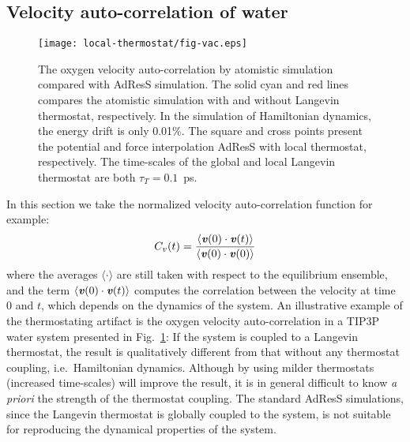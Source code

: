 \documentclass[epjST]{svjour}
\newcommand{\vect}[1]{\textbf{\textit{#1}}}
\begin{document}


\subsection{Velocity auto-correlation of water}

\begin{figure}
  \centering
  \texttt{[image: local-thermostat/fig-vac.eps]}
  \caption{The oxygen velocity auto-correlation by atomistic
    simulation compared with AdResS simulation.  The solid cyan and
    red lines compares the atomistic simulation with and without
    Langevin thermostat, respectively.
    In the simulation of Hamiltonian dynamics, the energy drift is only 0.01\%.
    The square and cross points
    present the potential and force interpolation AdResS with local
    thermostat, respectively.  The time-scales of the global and local Langevin
  thermostat are both $\tau_T = 0.1$~ps.}
  \label{fig:vac}
\end{figure}

In this section we take the normalized velocity auto-correlation function
for example:
\begin{align}
  C_v(t) = \frac{\langle \vect v(0)\cdot \vect v(t) \rangle}{\langle \vect v(0)\cdot \vect v(0) \rangle}
\end{align}
where the averages $\langle\cdot\rangle$ are still taken with respect
to the equilibrium ensemble, and the term
$\langle \vect v(0)\cdot \vect v(t)\rangle$ computes the correlation
between the velocity at time $0$ and $t$, which depends on the dynamics of the system. 
An illustrative example of the thermostating artifact is 
the oxygen velocity auto-correlation
in a TIP3P~\cite{jorgensen1983comparison} water system presented in Fig.~\ref{fig:vac}: If the system
is coupled to a Langevin thermostat, the result is qualitatively
different from that without any thermostat coupling, i.e.~Hamiltonian
dynamics. Although by using milder thermostats (increased time-scales)
will improve the result, it is in general difficult to know \emph{a priori}
the strength of the thermostat coupling.
The standard AdResS simulations, since the Langevin thermostat
is globally coupled to the system,  is not suitable for reproducing the dynamical
properties of the system.
\end{document}
